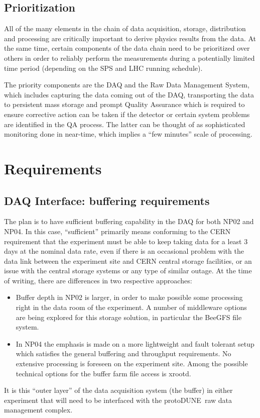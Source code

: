 \documentclass[pdftex,12pt,letter]{article}
\newcommand{\pd}{protoDUNE\ }
\begin{document}
\subsection{Prioritization}

All of the many elements in the chain of data acquisition, storage, distribution and processing are critically important to derive physics results  from the data.
At the same time, certain components of the data chain need to be prioritized over others in order to reliably perform the measurements during a potentially
limited time period (depending on the SPS and LHC running schedule).

The priority components are the DAQ and the Raw Data Management System, which includes capturing the data coming out of the DAQ,
transporting the data to persistent mass storage and prompt Quality Assurance which is required to ensure corrective action can be taken
if the detector or certain system problems are identified in the QA process. The latter can be thought of as sophisticated monitoring done in near-time,
which implies a ``few minutes'' scale of processing.

\section{Requirements}
\subsection{DAQ Interface: buffering requirements}
\label{sec:daq_interface}
The plan is to have sufficient buffering capability in the DAQ for both NP02 and NP04. In this case, ``sufficient''
primarily means conforming to the CERN requirement that the experiment must be able to keep taking data for a
least 3 days at the nominal data rate, even if there is an occasional problem with the data link between the
experiment site and CERN central storage facilities, or an issue with the central storage systems or any type of similar outage.
At the time of writing, there are differences in two respective approaches:
\begin{itemize}
\item Buffer depth in NP02 is larger, in order to make possible some processing right in the data room of the experiment. A number of middleware options are being explored for this storage solution, in particular the BeeGFS file system.

\item In NP04 the emphasis is made on a more lightweight and fault tolerant setup which satisfies the general buffering and throughput requirements.
No extensive processing is foreseen on the experiment site. Among the possible technical options for the buffer farm file access is xrootd.
\end{itemize}
It is this ``outer layer'' of the data acquisition system (the buffer) in either experiment that will need to be interfaced with
the \pd raw data management complex.
\end{document}
